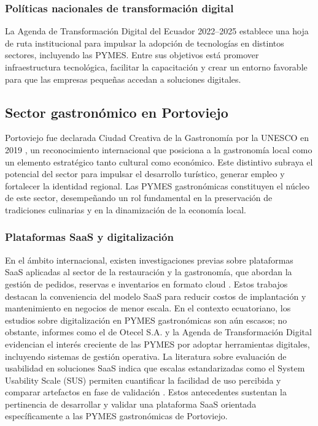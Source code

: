 \subsubsection{Políticas nacionales de transformación digital}

La Agenda de Transformación Digital del Ecuador 2022--2025 \parencite{Arcotel_2022} establece una hoja de ruta institucional para impulsar la adopción de tecnologías en distintos sectores, incluyendo las PYMES. Entre sus objetivos está promover infraestructura tecnológica, facilitar la capacitación y crear un entorno favorable para que las empresas pequeñas accedan a soluciones digitales.
\subsection{Sector gastronómico en Portoviejo}

Portoviejo fue declarada Ciudad Creativa de la Gastronomía por la UNESCO en 2019 \parencite{UNESCO2019}, un reconocimiento internacional que posiciona a la gastronomía local como un elemento estratégico tanto cultural como económico. Este distintivo subraya el potencial del sector para impulsar el desarrollo turístico, generar empleo y fortalecer la identidad regional. Las PYMES gastronómicas constituyen el núcleo de este sector, desempeñando un rol fundamental en la preservación de tradiciones culinarias y en la dinamización de la economía local.

\subsubsection{Plataformas SaaS y digitalización }

En el ámbito internacional, existen investigaciones previas sobre plataformas SaaS aplicadas al sector de la restauración y la gastronomía, que abordan la gestión de pedidos, reservas e inventarios en formato cloud \parencite{DuranMero2024}. Estos trabajos destacan la conveniencia del modelo SaaS para reducir costos de implantación y mantenimiento en negocios de menor escala. En el contexto ecuatoriano, los estudios sobre digitalización en PYMES gastronómicas son aún escasos; no obstante, informes como el de Otecel S.A. \parencite{MovistarEmpresas2024} y la Agenda de Transformación Digital \parencite{Arcotel_2022} evidencian el interés creciente de las PYMES por adoptar herramientas digitales, incluyendo sistemas de gestión operativa. La literatura sobre evaluación de usabilidad en soluciones SaaS indica que escalas estandarizadas como el System Usability Scale (SUS) permiten cuantificar la facilidad de uso percibida y comparar artefactos en fase de validación \parencite{AyoraRecalde2024}. Estos antecedentes sustentan la pertinencia de desarrollar y validar una plataforma SaaS orientada específicamente a las PYMES gastronómicas de Portoviejo.

